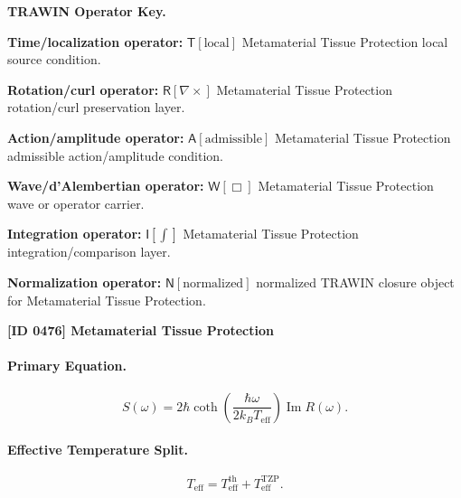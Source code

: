 \par\vspace{0.45\baselineskip}
\noindent\begin{minipage}[t]{\linewidth}
\begingroup
\small
\raggedright
\textbf{TRAWIN Operator Key.}\par
\noindent\textbf{Time/localization operator:} $\mathsf{T}\!\left[\mathrm{local}\right]$ Metamaterial Tissue Protection local source condition.\par
\noindent\textbf{Rotation/curl operator:} $\mathsf{R}\!\left[\nabla\times\right]$ Metamaterial Tissue Protection rotation/curl preservation layer.\par
\noindent\textbf{Action/amplitude operator:} $\mathsf{A}\!\left[\mathrm{admissible}\right]$ Metamaterial Tissue Protection admissible action/amplitude condition.\par
\noindent\textbf{Wave/d'Alembertian operator:} $\mathsf{W}\!\left[\Box\right]$ Metamaterial Tissue Protection wave or operator carrier.\par
\noindent\textbf{Integration operator:} $\mathsf{I}\!\left[\int\right]$ Metamaterial Tissue Protection integration/comparison layer.\par
\noindent\textbf{Normalization operator:} $\mathsf{N}\!\left[\mathrm{normalized}\right]$ normalized TRAWIN closure object for Metamaterial Tissue Protection.\par
\endgroup
\end{minipage}

\clearpage
\noindent\textbf{[ID 0476] Metamaterial Tissue Protection}\par
\vspace{0.35em}
\paragraph{Primary Equation.}
\begin{equation}
S(\omega)
=
2\hbar
\coth\left(
\frac{\hbar\omega}{2k_B T_{\mathrm{eff}}}
\right)
\operatorname{Im}R(\omega).
\end{equation}

\paragraph{Effective Temperature Split.}
\begin{equation}
T_{\mathrm{eff}}
=
T_{\mathrm{eff}}^{\mathrm{th}}
+
T_{\mathrm{eff}}^{\mathrm{TZP}} .
\end{equation}

